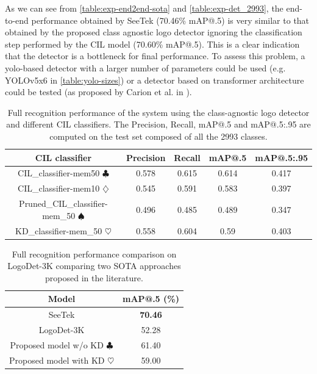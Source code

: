As we can see from \autoref{table:exp-end2end-sota} and \autoref{table:exp-det_2993}, the end-to-end performance obtained by SeeTek (70.46\% mAP@.5) is very similar to that obtained by the proposed class agnostic logo detector ignoring the classification step performed by the CIL model (70.60\% mAP@.5). This is a clear indication that the detector is a bottleneck for final performance. To assess this problem, a yolo-based detector with a larger number of parameters could be used (e.g. YOLOv5x6 in \autoref{table:yolo-sizes}) or a detector based on transformer architecture could be tested (as proposed by Carion et al. in \cite{carion2020end}).

\begin{table}[H]
    \centering
    \begin{tabular}{c|c|c|c|c}
        \hline
        \textbf{CIL classifier} &
        \textbf{Precision} &
        \textbf{Recall} &
        \textbf{mAP@.5} &
        \textbf{mAP@.5:.95} \\
        \hline
        \hline
CIL\_classifier-mem50 $\clubsuit$&0.578&0.615&0.614&0.417\\
CIL\_classifier-mem10 $\diamondsuit$&0.545&0.591&0.583&0.397\\
Pruned\_CIL\_classifier-mem\_50 $\spadesuit$&0.496&0.485&0.489&0.347\\
KD\_classifier-mem\_50 $\heartsuit$&0.558&0.604&0.59&0.403\\
\hline
\end{tabular}
\caption{Full recognition performance of the system using the class-agnostic logo detector and different CIL classifiers. The Precision, Recall, mAP@.5 and mAP@.5:.95 are computed on the test set composed of all the 2993 classes.}
    \label{table:exp-end2end}
\end{table}


\begin{table}[H]
    \centering
    \begin{tabular}{c|c}
        \hline
        \textbf{Model} &
        \textbf{mAP@.5 (\%)}\\
        \hline
        \hline
SeeTek \cite{li2022seetek}&\textbf{70.46}\\
LogoDet-3K \cite{wang2022logodet}&52.28\\
\hline
Proposed model w/o KD $\clubsuit$&61.40\\
Proposed model with KD $\heartsuit$&59.00\\
\hline
\end{tabular}
\caption{Full recognition performance comparison on LogoDet-3K comparing two SOTA approaches proposed in the literature.}
    \label{table:exp-end2end-sota}
\end{table}
